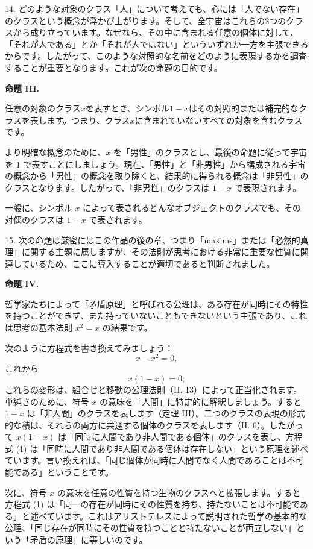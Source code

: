 \documentclass[a4paper,11pt,openany]{ltjsbook}
\begin{document}
14. どのような対象のクラス「人」について考えても、心には「人でない存在」のクラスという概念が浮かび上がります。そして、全宇宙はこれらの2つのクラスから成り立っています。なぜなら、その中に含まれる任意の個体に対して、「それが人である」とか「それが人ではない」といういずれか一方を主張できるからです。したがって、このような対照的な名前をどのように表現するかを調査することが重要となります。これが次の命題の目的です。

\textbf{命題 III.}

任意の対象のクラス$x$を表すとき、シンボル$1 - x$はその対照的または補完的なクラスを表します。つまり、クラス$x$に含まれていないすべての対象を含むクラスです。

より明確な概念のために、$x$ を「男性」のクラスとし、最後の命題に従って宇宙を $1$ で表すことにしましょう。現在、「男性」と「非男性」から構成される宇宙の概念から「男性」の概念を取り除くと、結果的に得られる概念は「非男性」のクラスとなります。したがって、「非男性」のクラスは $1 - x$ で表現されます。

一般に、シンボル $x$ によって表されるどんなオブジェクトのクラスでも、その対偶のクラスは $1 - x$ で表されます。

15. 次の命題は厳密にはこの作品の後の章、つまり「maxims」または「必然的真理」に関する主題に属しますが、その法則が思考における非常に重要な性質に関連しているため、ここに導入することが適切であると判断されました。

\textbf{命題 IV.}

哲学家たちによって「矛盾原理」と呼ばれる公理は、ある存在が同時にその特性を持つことができず、また持っていないこともできないという主張であり、これは思考の基本法則 $x^2 = x$ の結果です。

次のように方程式を書き換えてみましょう：
\[
x - x^2 = 0,
\]
これから
\setcounter{equation}{0}
\begin{equation}
x(1-x) = 0;
\end{equation}
これらの変形は、組合せと移動の公理法則（II. 13）によって正当化されます。単純さのために、符号 $x$ の意味を「人間」に特定的に解釈しましょう。すると $1 - x$ は「非人間」のクラスを表します（定理 III）。二つのクラスの表現の形式的な積は、それらの両方に共通する個体のクラスを表します（II. 6）。したがって $x(1-x)$ は「同時に人間であり非人間である個体」のクラスを表し、方程式 (1) は「同時に人間であり非人間である個体は存在しない」という原理を述べています。言い換えれば、「同じ個体が同時に人間でなく人間であることは不可能である」ということです。

次に、符号 $x$ の意味を任意の性質を持つ生物のクラスへと拡張します。すると方程式 (1) は「同一の存在が同時にその性質を持ち、持たないことは不可能である」と述べています。これはアリストテレスによって説明された哲学の基本的な公理、「同じ存在が同時にその性質を持つことと持たないことが両立しない」という「矛盾の原理」に等しいのです。
\end{document}
